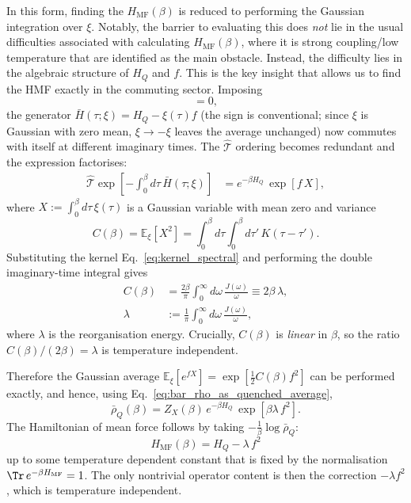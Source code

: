 In this form, finding the $H_{\mathrm{MF}}(\beta)$ is reduced to performing the Gaussian integration over $\xi$. Notably, the barrier to evaluating this does \emph{not} lie in the usual difficulties associated with calculating $H_{\mathrm{MF}}(\beta)$, where it is strong coupling/low temperature that are identified as the main obstacle. Instead, the difficulty lies in the algebraic structure of $H_Q$ and $f$. This is the key insight that allows us to find the HMF exactly in the commuting sector. Imposing
\begin{equation}
    [H_Q,f]=0,
    \label{eq:commuting_here}
\end{equation}
the generator $\bar{H}(\tau;\xi) = H_Q - \xi(\tau) f$ (the sign is conventional; since $\xi$ is Gaussian with zero mean, $\xi\to-\xi$ leaves the average unchanged) now commutes with itself at different imaginary times. The $\hat{\mathcal{T}}$ ordering becomes redundant and the expression factorises:
\begin{align}
    \hat{\mathcal{T}}\exp\!\left[-\int_0^\beta d\tau\,\bar{H}(\tau;\xi)\right]
    &=
    e^{-\beta H_Q}\, \exp\!\left[f\,X\right],
    \label{eq:tilde_rho_commuting_factorised}
\end{align}
where $X:=\int_0^\beta d\tau\,\xi(\tau)$ is a Gaussian variable with mean zero and variance
\begin{equation}
    C(\beta) = \mathbb E_\xi[X^2] = \int_0^\beta d\tau\int_0^\beta d\tau'\,K(\tau-\tau').
    \label{eq:Cbeta_def}
\end{equation}
Substituting the kernel Eq.~\eqref{eq:kernel_spectral} and performing the double
imaginary-time integral gives
\begin{align}
    C(\beta)
    &=\frac{2\beta}{\pi}\int_0^\infty d\omega\,\frac{J(\omega)}{\omega}
    \equiv 2\beta\,\lambda,
    \nonumber\\
    \lambda&:=\frac{1}{\pi}\int_0^\infty d\omega\,\frac{J(\omega)}{\omega},
    \label{eq:Cbeta_explicit}
\end{align}
where $\lambda$ is the reorganisation energy.
Crucially, $C(\beta)$ is \emph{linear} in $\beta$, so the ratio
$C(\beta)/(2\beta)=\lambda$ is temperature independent.

Therefore the Gaussian average $\mathbb E_\xi[e^{f X}] = \exp[\frac{1}{2}C(\beta)f^2]$ can be performed exactly, and hence, using Eq.~\eqref{eq:bar_rho_as_quenched_average},
\begin{equation}
    \bar\rho_Q(\beta) = Z_X(\beta)\,e^{-\beta H_Q}\,\exp\!\left[\beta\lambda\,f^2\right].
    \label{eq:bar_rho_commuting_closed}
\end{equation}
The Hamiltonian of mean force follows by taking
$-\frac{1}{\beta}\log\bar\rho_Q$:
\begin{equation}
    H_{\mathrm{MF}}(\beta) = H_Q -\lambda\,f^2 
    \label{eq:HMF_commuting_final}
\end{equation}
up to some temperature dependent constant that is fixed by the normalisation
$\Tr\,e^{-\beta H_{\mathrm{MF}}}=1$. The only nontrivial operator content is then the correction $-\lambda f^2$, which
is temperature independent.

